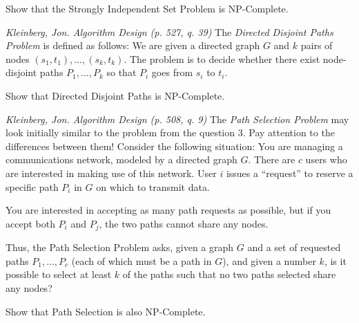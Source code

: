 \documentclass[solutionorbox]{exam} %
\begin{document}
\begin{questions}
Show that the Strongly Independent Set Problem is NP-Complete.

\begin{solutionbox}{}
\end{solutionbox}



\newpage
\question
\emph{Kleinberg, Jon. Algorithm Design (p. 527, q. 39)} The \emph{Directed Disjoint Paths Problem} is defined as follows: We are given a directed graph $G$ and $k$ pairs of nodes $(s_1,t_1),\ldots,(s_k,t_k)$. The problem is to decide whether there exist node-disjoint paths $P_1,\ldots,P_k$ so that $P_i$ goes from $s_i$ to $t_i$.

Show that Directed Disjoint Paths is NP-Complete.

\begin{solutionbox}{}
\end{solutionbox}

\newpage
\question
\emph{Kleinberg, Jon. Algorithm Design (p. 508, q. 9)} The \emph{Path Selection Problem} may look initially similar to the problem from the question 3. Pay attention to the differences between them!
Consider the following situation: You are managing a communications network, modeled by a directed graph $G$. There are $c$ users who are interested in making use of this network. User $i$ issues a ``request'' to reserve a specific path $P_i$ in $G$ on which to transmit data.

You are interested in accepting as many path requests as possible, but if you accept both $P_i$ and $P_j$, the two paths cannot share any nodes.

Thus, the Path Selection Problem asks, given a graph $G$ and a set of requested paths $P_1,\ldots,P_c$ (each of which must be a path in $G$), and given a number $k$, is it possible to select at least $k$ of the paths such that no two paths selected share any nodes?

Show that Path Selection is also NP-Complete.

\begin{solutionbox}{}
\end{solutionbox}



\end{questions}
\end{document}
